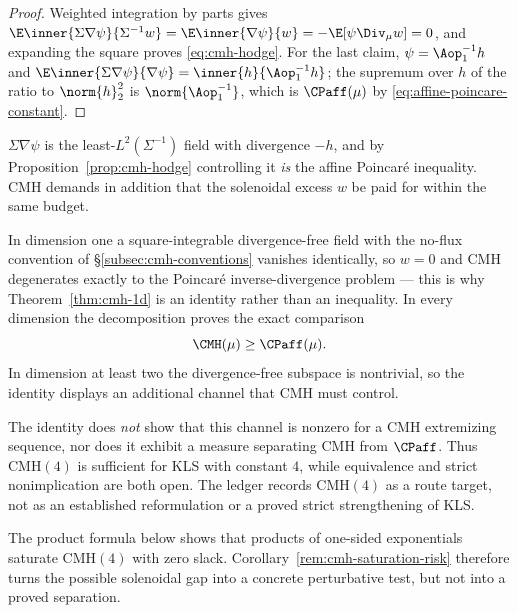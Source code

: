 \documentclass[../../main.tex]{subfiles}
\begin{document}
\begin{proof}
Weighted integration by parts gives
$\E\inner{\Sigma\nabla\psi}{\Sigma^{-1}w}=\E\inner{\nabla\psi}{w}=-\E[\psi\Div_\mu w]=0$, and
expanding the square proves \eqref{eq:cmh-hodge}. For the last claim,
$\psi=\Aop_1^{-1}h$ and
$\E\inner{\Sigma\nabla\psi}{\nabla\psi}=\inner{h}{\Aop_1^{-1}h}$; the supremum over $h$ of the
ratio to $\norm{h}_2^2$ is $\norm{\Aop_1^{-1}}$, which is $\CPaff(\mu)$ by
\eqref{eq:affine-poincare-constant}.
\end{proof}

\begin{corollary}
\label{rem:cmh-stronger-than-kls}
$\Sigma\nabla\psi$ is the least-$L^2(\Sigma^{-1})$ field with divergence $-h$, and by
Proposition~\ref{prop:cmh-hodge} controlling it \emph{is} the affine Poincar\'e inequality. CMH
demands in addition that the solenoidal excess $w$ be paid for within the same budget.

In dimension one a square-integrable divergence-free field with the no-flux convention of
\S\ref{subsec:cmh-conventions} vanishes identically, so $w=0$ and CMH degenerates exactly to
the Poincar\'e inverse-divergence problem --- this is why Theorem~\ref{thm:cmh-1d} is an
identity rather than an inequality.  In every dimension the decomposition proves the exact
comparison
\[
  \CMH(\mu)\ge\CPaff(\mu).
\]
In dimension at least two the divergence-free subspace is nontrivial, so the identity displays
an additional channel that CMH must control.
\end{corollary}

\begin{remark}
The identity does \emph{not} show that this channel
is nonzero for a CMH extremizing sequence, nor does it exhibit a measure separating CMH from
$\CPaff$.  Thus $\mathrm{CMH}(4)$ is sufficient for KLS with constant $4$, while equivalence
and strict nonimplication are both open.  The ledger records $\mathrm{CMH}(4)$ as a route target,
not as an established reformulation or a proved strict strengthening of KLS.
\end{remark}

The product formula below shows that products of one-sided exponentials saturate
$\mathrm{CMH}(4)$ with zero slack.  Corollary~\ref{rem:cmh-saturation-risk} therefore turns the
possible solenoidal gap into a concrete perturbative test, but not into a proved separation.
\end{document}
